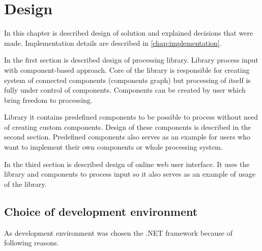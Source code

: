
\chapter{Design}

In this chapter is described design of solution and explained decisions that were made.
Implementation details are described in \autoref{chap:implementation}.

In the first section is described design of \lsystem processing library.
Library process input with component-based approach.
Core of the library is responsible for creating system of connected components (components graph) but processing of \lsystem itself is fully under control of components.
Components can be created by user which bring freedom to \lsystem processing.

Library it contains predefined components to be possible to process \lsystems without need of creating custom components.
Design of these components is described in the second section.
Predefined components also serves as an example for users who want to implement their own components or whole processing system.

In the third section is described design of online web user interface.
It uses the library and components to process input so it also serves as an example of usage of the library.


\section{Choice of development environment}

As development environment was chosen the .NET framework because of following reasons.

